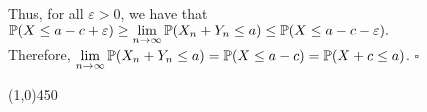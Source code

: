\documentclass[12pt]{article}
\begin{document}
\noindent
Thus, for all $\varepsilon>0$, we have that $\mathbb{P}(X\leq a-c+\varepsilon) \geq \lim\limits_{n\to\infty} \mathbb{P}(X_n+Y_n\leq a) \leq \mathbb{P}(X\leq a-c-\varepsilon).$\\

\noindent
Therefore, $ \lim\limits_{n\to\infty} \mathbb{P}(X_n+Y_n\leq a)=\mathbb{P}(X \leq a-c) = \mathbb{P}(X+c \leq a)$. $\square$

\begin{center}
\line(1,0){450}
\end{center}
\end{document}
